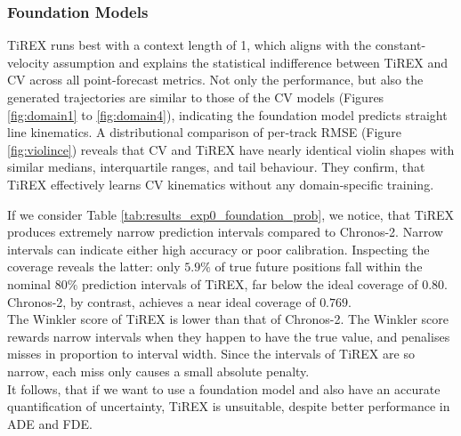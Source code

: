                 
                \subsubsection{Foundation Models}
                    TiREX runs best with a context length of 1, which aligns with the constant-velocity 
                assumption and explains the %
                statistical indifference between TiREX and \ac{CV} across all point-forecast metrics. Not only the performance, but also the generated trajectories are similar to those of the \ac{CV} models (Figures \ref{fig:domain1} to \ref{fig:domain4}), indicating the foundation model predicts straight line kinematics. A distributional comparison of per‑track \ac{RMSE} (Figure \ref{fig:violince}) reveals that \ac{CV} and TiREX have nearly identical violin shapes with similar medians, interquartile ranges, and tail behaviour. They confirm, that TiREX effectively learns \ac{CV} kinematics without any domain‑specific training.

                    If we consider Table \ref{tab:results_exp0_foundation_prob}, we notice, that TiREX produces extremely narrow prediction intervals compared to Chronos-2. Narrow intervals can indicate either high accuracy or 
                    poor calibration. Inspecting the coverage reveals the latter: only $5.9\%$ of true 
                    future positions fall within the nominal $80\%$ prediction intervals of TiREX, far below 
                    the ideal coverage of $0.80$. Chronos-2, by contrast, achieves a near ideal coverage of $0.769$. \\                    
                    The Winkler score of TiREX is lower than that of Chronos-2. The Winkler score rewards narrow 
                    intervals when they happen to have the true value, and penalises misses in proportion 
                    to interval width. Since the intervals of TiREX are so narrow, each miss only causes a small absolute penalty. \\                    
                    It follows, that if we want to use a foundation model and also have an accurate quantification of uncertainty, TiREX is unsuitable, despite better performance in ADE and FDE.
                

